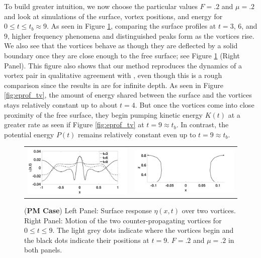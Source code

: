 \documentclass[a4paper,11pt]{article}
\begin{document}
To build greater intuition, we now choose the particular values $F=.2$ and $\mu=.2$ and look at simulations of the surface, vortex positions, and energy for $0\leq t \leq t_{b}\approx 9$.  As seen in Figure \ref{fig:surfrepFpt2}, comparing the surface profiles at $t=3$, $6$, and $9$, higher frequency phenomena and distinguished peaks form as the vortices rise.  We also see that the vortices behave as though they are deflected by a solid boundary once they are close enough to the free surface; see Figure \ref{fig:surfrepFpt2} (Right Panel).  This figure also shows that our method reproduces the dynamics of a vortex pair in qualitative agreement with \cite{tryggvason}, even though this is a rough comparison since the results in \cite{tryggvason} are for infinite depth.  As seen in Figure \ref{fig:eprof_tv}, the amount of energy shared between the surface and the vortices stays relatively constant up to about $t=4$.  But once the vortices come into close proximity of the free surface, they begin pumping kinetic energy $K(t)$ at a greater rate as seen if Figure \ref{fig:eprof_tv} at $t=9\approx t_{b}$. In contrast, the potential energy $P(t)$ remains relatively constant even up to $t=9\approx t_{b}$.  
%
\begin{figure}[!h]
\centering
\begin{tabular}{cc}
\includegraphics[width=.5\textwidth]{surf_resp_mu_pt2_F_pt2} & 
\includegraphics[width=.5\textwidth]{tracks_F_pt2_tf_9}
\end{tabular}
\caption{\small ({\bf PM Case}) Left Panel: Surface response $\eta(x,t)$ over two vortices.  Right Panel: Motion of the two counter-propagating vortices for $0\leq t \leq 9$.  The light grey dots indicate where the vortices begin and the black dots indicate their positions at $t=9$.  $F=.2$ and $\mu=.2$ in both panels.}
\label{fig:surfrepFpt2}
\end{figure}
%
\end{document}
